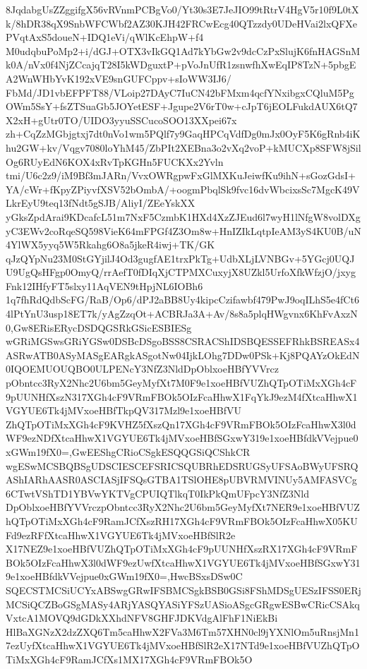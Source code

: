 \documentclass[multi=frame]{standalone}
\begin{document}
\begin{world}
        8JqdabgUsZZggifgX56vRVnmPCBgVo0/Yt30s3E7JeJIO99tRtrV4HgV5r10f9L0tXk/8hDR38qX9SnbWFCWbf2AZ30KJH42FRCwEcg40QTzzdy0UDeHVai2lxQFXePVqtAxS5doueN+IDQ1eVi/qWlKcEhpW+f4
        M0udqbuPoMp2+i/dGJ+OTX3vIkGQ1Ad7kYbGw2v9dcCzPxSlujK6fnHAGSnMk0A/nVx0f4NjZCcajqT28I5kWDguxtP+pVoJnUfR1zsnwfhXwEqIP8TzN+5pbgEA2WnWHbYvK192xVE9snGUFCppv+sIoWW3IJ6/
        FbMd/JD1vbEFPFT88/VLoip27DAyC7IuCN42bFMxm4qcfYNxibgxCQluM5PgOWm5SsY+fsZTSuaGb5JOYetESF+Jgupe2V6rT0w+cJpT6jEOLFukdAUX6tQ7X2xH+gUtr0TO/UIDO3yyuSSCucoSOO13XXpei67x
        zh+CqZzMGbjgtxj7dt0nVo1wm5PQlf7y9GaqHPCqVdfDg0mJx0OyF5K6gRnb4iKhu2GW+kv/Vqgv7080loYhM45/ZbPIt2XEBna3o2vXq2voP+kMUCXp8SFW8jSilOg6RUyEdN6KOX4xRvTpKGHn5FUCKXx2Yvln
        tmi/U6c2z9/iM9Bf3mJARn/VvxOWRgpwFxGlMXKuJeiwfKu9ihN+sGozGdsI+YA/cWr+fKpyZPiyvfXSV52bOmbA/+oogmPbqlSk9fvc16dvWbcixsSc7MgcK49VLkrEyU9teq13fNdt5gSJB/AliyI/ZEeYskXX
        yGksZpdArai9KDcafcL51m7NxF5CzmbK1HXd4XzZJEud6l7wyH1lNfgW8volDXgyC3EWv2coRqeSQ598VieK64mFPGf4Z3Om8w+HnIZIkLqtpIeAM3yS4KU0B/uN4YlWX5yyq5W5Rkahg6O8a5jkeR4iwj+TK/GK
        qJzQYpNu23M0StGYjilJ4Od3gugfAE1trxPkTg+UdbXLjLVNBGv+5YGcj0UQJU9UgQsHFgp0OmyQ/rrAefT0fDIqXjCTPMXCuxyjX8UZkl5UrfoXfkWfzjO/jxygFnk12IHfyFT5slxy11AqVEN9tHpjNL6IOBh6
        1q7fhRdQdbScFG/RaB/Op6/dPJ2aBB8Uy4kipcCzifawbf479PwJ9oqILhS5e4fCt64lPtYnU3usp18ET7k/yAgZzqOt+ACBRJa3A+Av/8s8a5plqHWgvnx6KhFvAxzN0,Gw8ERisERycDSDQGSRkGSicESBIESg
        wGRiMGSwsGRiYGSw0DSBcDSgoBSS8CSRACShIDSBQESSEFRhkBSREASx4ASRwATB0ASyMASgEARgkASgotNw04IjkLOhg7DDw0PSk+Kj8PQAYzOkEdN0IQOEMUOUQBO0ULPENcY3NfZ3NldDpOblxoeHBfYVVrcz
        pObntcc3RyX2Nhc2U6bm5GeyMyfXt7M0F9e1xoeHBfVUZhQTpOTiMxXGh4cF9pUUNHfXszN317XGh4cF9VRmFBOk5OIzFcaHhwX1FqYkJ9ezM4fXtcaHhwX1VGYUE6Tk4jMVxoeHBfTkpQV317Mzl9e1xoeHBfVU
        ZhQTpOTiMxXGh4cF9KVHZ5fXszQn17XGh4cF9VRmFBOk5OIzFcaHhwX3l0dWF9ezNDfXtcaHhwX1VGYUE6Tk4jMVxoeHBfSGxwY319e1xoeHBfdkVVejpue0xGWm19fX0=,GwEEShgCRioCSgkESQQGSiQCShkCR
        wgESwMCSBQBSgUDSCIESCEFSRICSQUBRhEDSRUGSyUFSAoBWyUFSRQAShIARhAASR0ASCIASjIFSQsGTBA1TSlOHE8pUBVRMVINUy5AMFASVCg6CTwtVShTD1YBVwYKTVgCPUIQTlkqT0IkPkQmUFpcY3NfZ3Nld
        DpOblxoeHBfYVVrczpObntcc3RyX2Nhc2U6bm5GeyMyfXt7NER9e1xoeHBfVUZhQTpOTiMxXGh4cF9RamJCfXszRH17XGh4cF9VRmFBOk5OIzFcaHhwX05KUFd9ezRFfXtcaHhwX1VGYUE6Tk4jMVxoeHBfSlR2e
        X17NEZ9e1xoeHBfVUZhQTpOTiMxXGh4cF9pUUNHfXszRX17XGh4cF9VRmFBOk5OIzFcaHhwX3l0dWF9ezUwfXtcaHhwX1VGYUE6Tk4jMVxoeHBfSGxwY319e1xoeHBfdkVVejpue0xGWm19fX0=,HwcBSxsDSw0C
        SQECSTMCSiUCYxABSwgGRwIFSBMCSgkBSB0GSi8FShMDSgUESzIFSS0ERjMCSiQCZBoGSgMASy4ARjYASQYASiYFSzUASioASgcGRgwESBwCRicCSAkqVxtcA1MOVQ9dGDkXXhdNFV8GHFJDKVdgAlFhF1NiEkBi
        HlBaXGNzX2dzZXQ6Tm5caHhwX2FVa3M6Tm57XHN0cl9jYXNlOm5uRnsjMn17ezUyfXtcaHhwX1VGYUE6Tk4jMVxoeHBfSlR2eX17NTd9e1xoeHBfVUZhQTpOTiMxXGh4cF9RamJCfXs1MX17XGh4cF9VRmFBOk5O

\end{world}
\end{document}
